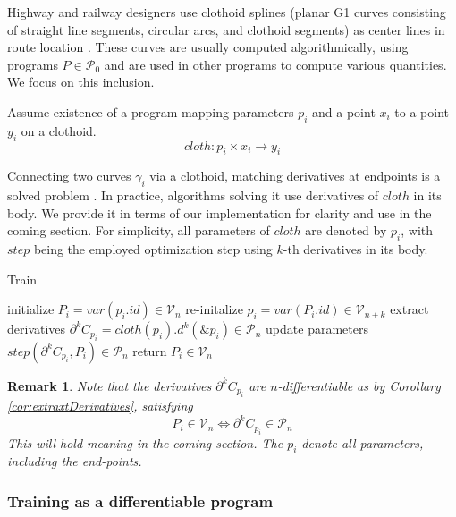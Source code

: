 \documentclass{article}
\newcommand{\VV}{\mathcal{V}}
\newcommand{\dP}{\mathcal{P}}
\newcommand{\D}{\partial}
\newtheorem{opomba}{Remark}[section]
\begin{document}
Highway and railway designers use clothoid splines (planar G1
curves consisting of straight line segments, circular arcs, and clothoid segments)
as center lines in route location \cite{ClothoidSpline}. These curves are usually computed algorithmically, using programs $P\in\dP_0$ and are used in other programs to compute various quantities. We focus on this inclusion.

Assume existence of a program mapping parameters $p_i$ and a point $x_i$ to a point $y_i$ on a clothoid.
\begin{equation}
cloth:p_i\times x_i\to y_i
\end{equation} 

Connecting two curves $\gamma_i$ via a clothoid, matching derivatives at endpoints is a solved problem \cite[Theorem~2]{ClothoidSpline}. In practice, algorithms solving it use derivatives of $cloth$ in its body. We provide it in terms of our implementation for clarity and use in the coming section. For simplicity, all parameters of $cloth$ are denoted by $p_i$, with $step$ being the employed optimization step using $k$-th derivatives in its body.

 \begin{algorithm}[H]
   \caption{Train}
   \label{alg:train}
   \begin{algorithmic}[1]
   \State initialize $P_i=var(p_i.id)\in\VV_{n}$
   \State re-initalize $p_i=var(P_i.id)\in\VV_{n+k}$
   \State extract derivatives $\D^k C_{p_i}=cloth(p_i).d^k(\&p_i)\in\dP_{n}$
   \State update parameters $step(\D^k C_{p_i}, P_i)\in\dP_n$
   \EndFor
   \State return $P_i\in\VV_{n}$
   \EndProcedure
   \end{algorithmic}
   \end{algorithm}
\begin{opomba}\label{rmr:dDerivatives}
Note that the derivatives $\D^k C_{p_i}$ are $n$-differentiable as by Corollary \ref{cor:extraxtDerivatives}, satisfying 
\begin{equation}
P_i\in\VV_n\iff \D^k C_{p_i}\in\dP_n
\end{equation}
This will hold meaning in the coming section. The $p_i$ denote all parameters, including the end-points. 
\end{opomba} 

\subsubsection{Training as a differentiable program}
\end{document}
